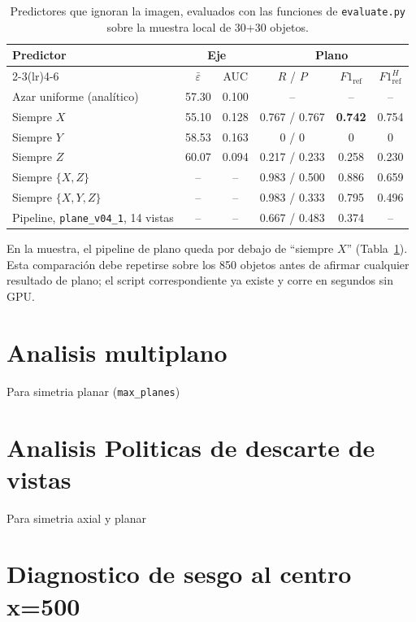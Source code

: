 \begin{table}[htbp]
\centering
\caption{Predictores que ignoran la imagen, evaluados con las funciones de
\texttt{evaluate.py} sobre la muestra local de 30+30 objetos.}
\label{tab:sm_triviales}
\begin{tabular}{lccccc}
\toprule
Predictor & \multicolumn{2}{c}{Eje} & \multicolumn{3}{c}{Plano} \\
\cmidrule(lr){2-3}\cmidrule(lr){4-6}
 & $\bar{\varepsilon}$ & AUC & $R$ / $P$ & $F1_{\text{ref}}$ & $F1^{H}_{\text{ref}}$ \\
\midrule
Azar uniforme (analítico) & 57.30 & 0.100 & -- & -- & -- \\
Siempre $X$ & 55.10 & 0.128 & 0.767 / 0.767 & \textbf{0.742} & 0.754 \\
Siempre $Y$ & 58.53 & 0.163 & 0 / 0 & 0 & 0 \\
Siempre $Z$ & 60.07 & 0.094 & 0.217 / 0.233 & 0.258 & 0.230 \\
Siempre $\{X,Z\}$ & -- & -- & 0.983 / 0.500 & 0.886 & 0.659 \\
Siempre $\{X,Y,Z\}$ & -- & -- & 0.983 / 0.333 & 0.795 & 0.496 \\
\midrule
Pipeline, \texttt{plane\_v04\_1}, 14 vistas & -- & -- & 0.667 / 0.483 & 0.374 & -- \\
\bottomrule
\end{tabular}
\end{table}

En la muestra, el pipeline de plano queda por debajo de ``siempre $X$''
(Tabla~\ref{tab:sm_triviales}). Esta comparación debe repetirse sobre los 850
objetos antes de afirmar cualquier resultado de plano; el script correspondiente ya
existe y corre en segundos sin GPU.



\newpage
\section{Analisis multiplano}

Para simetria planar (\texttt{max\_planes})

\section{Analisis Politicas de descarte de vistas}

Para simetria axial y planar

\section{Diagnostico de sesgo al centro x=500}

